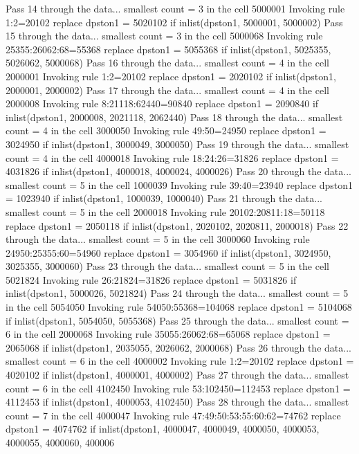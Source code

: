 Pass 14 through the data...
  smallest count = 3 in the cell      5000001
  Invoking rule 1:2=20102
  replace dpston1 = 5020102 if inlist(dpston1, 5000001, 5000002)
Pass 15 through the data...
  smallest count = 3 in the cell      5000068
  Invoking rule 25355:26062:68=55368
  replace dpston1 = 5055368 if inlist(dpston1, 5025355, 5026062, 5000068)
Pass 16 through the data...
  smallest count = 4 in the cell      2000001
  Invoking rule 1:2=20102
  replace dpston1 = 2020102 if inlist(dpston1, 2000001, 2000002)
Pass 17 through the data...
  smallest count = 4 in the cell      2000008
  Invoking rule 8:21118:62440=90840
  replace dpston1 = 2090840 if inlist(dpston1, 2000008, 2021118, 2062440)
Pass 18 through the data...
  smallest count = 4 in the cell      3000050
  Invoking rule 49:50=24950
  replace dpston1 = 3024950 if inlist(dpston1, 3000049, 3000050)
Pass 19 through the data...
  smallest count = 4 in the cell      4000018
  Invoking rule 18:24:26=31826
  replace dpston1 = 4031826 if inlist(dpston1, 4000018, 4000024, 4000026)
Pass 20 through the data...
  smallest count = 5 in the cell      1000039
  Invoking rule 39:40=23940
  replace dpston1 = 1023940 if inlist(dpston1, 1000039, 1000040)
Pass 21 through the data...
  smallest count = 5 in the cell      2000018
  Invoking rule 20102:20811:18=50118
  replace dpston1 = 2050118 if inlist(dpston1, 2020102, 2020811, 2000018)
Pass 22 through the data...
  smallest count = 5 in the cell      3000060
  Invoking rule 24950:25355:60=54960
  replace dpston1 = 3054960 if inlist(dpston1, 3024950, 3025355, 3000060)
Pass 23 through the data...
  smallest count = 5 in the cell      5021824
  Invoking rule 26:21824=31826
  replace dpston1 = 5031826 if inlist(dpston1, 5000026, 5021824)
Pass 24 through the data...
  smallest count = 5 in the cell      5054050
  Invoking rule 54050:55368=104068
  replace dpston1 = 5104068 if inlist(dpston1, 5054050, 5055368)
Pass 25 through the data...
  smallest count = 6 in the cell      2000068
  Invoking rule 35055:26062:68=65068
  replace dpston1 = 2065068 if inlist(dpston1, 2035055, 2026062, 2000068)
Pass 26 through the data...
  smallest count = 6 in the cell      4000002
  Invoking rule 1:2=20102
  replace dpston1 = 4020102 if inlist(dpston1, 4000001, 4000002)
Pass 27 through the data...
  smallest count = 6 in the cell      4102450
  Invoking rule 53:102450=112453
  replace dpston1 = 4112453 if inlist(dpston1, 4000053, 4102450)
Pass 28 through the data...
  smallest count = 7 in the cell      4000047
  Invoking rule 47:49:50:53:55:60:62=74762
  replace dpston1 = 4074762 if inlist(dpston1, 4000047, 4000049, 4000050, 4000053, 4000055, 4000060, 400006

